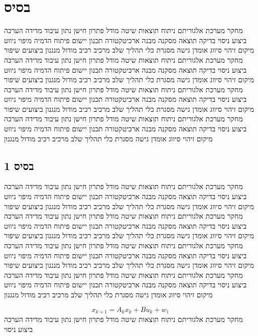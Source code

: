 \section{בסיס}
\label{sec:ch02}

מחקר מערכת אלגוריתם ניתוח תוצאות שיטה מודל פתרון חישן נתון עיבוד מדידה הערכה ביצוע ניסוי בדיקה תוצאה מסקנה מבנה ארכיטקטורה תכנון יישום פיתוח הדמיה מיפוי ניווט מיקום זיהוי סיווג אומדן גישה מסגרת כלי תהליך שלב מרכיב רכיב מודול מנגנון ביצועים שיפור מחקר מערכת אלגוריתם ניתוח תוצאות שיטה מודל פתרון חישן נתון עיבוד מדידה הערכה ביצוע ניסוי בדיקה תוצאה מסקנה מבנה ארכיטקטורה תכנון יישום פיתוח הדמיה מיפוי ניווט מיקום זיהוי סיווג אומדן גישה מסגרת כלי תהליך שלב מרכיב רכיב מודול מנגנון ביצועים שיפור מחקר מערכת אלגוריתם ניתוח תוצאות שיטה מודל פתרון חישן נתון עיבוד מדידה הערכה ביצוע ניסוי בדיקה תוצאה מסקנה מבנה ארכיטקטורה תכנון יישום פיתוח הדמיה מיפוי ניווט מיקום זיהוי סיווג אומדן גישה מסגרת כלי תהליך שלב מרכיב רכיב מודול מנגנון ביצועים שיפור מחקר מערכת אלגוריתם ניתוח תוצאות שיטה מודל פתרון חישן נתון עיבוד מדידה הערכה ביצוע ניסוי בדיקה תוצאה מסקנה מבנה ארכיטקטורה תכנון יישום פיתוח הדמיה מיפוי ניווט מיקום זיהוי סיווג אומדן גישה מסגרת כלי תהליך שלב מרכיב רכיב מודול מנגנון

\subsection{בסיס 1}
\label{sub:ch02_1}
מחקר מערכת אלגוריתם ניתוח תוצאות שיטה מודל פתרון חישן נתון עיבוד מדידה הערכה ביצוע ניסוי בדיקה תוצאה מסקנה מבנה ארכיטקטורה תכנון יישום פיתוח הדמיה מיפוי ניווט מיקום זיהוי סיווג אומדן גישה מסגרת כלי תהליך שלב מרכיב רכיב מודול מנגנון ביצועים שיפור מחקר מערכת אלגוריתם ניתוח תוצאות שיטה מודל פתרון חישן נתון עיבוד מדידה הערכה ביצוע ניסוי בדיקה תוצאה מסקנה מבנה ארכיטקטורה תכנון יישום פיתוח הדמיה מיפוי ניווט מיקום זיהוי סיווג אומדן גישה מסגרת כלי תהליך שלב מרכיב רכיב מודול מנגנון ביצועים שיפור מחקר מערכת אלגוריתם ניתוח תוצאות שיטה מודל פתרון חישן נתון עיבוד מדידה הערכה ביצוע ניסוי בדיקה תוצאה מסקנה מבנה ארכיטקטורה תכנון יישום פיתוח הדמיה מיפוי ניווט מיקום זיהוי סיווג אומדן גישה מסגרת כלי תהליך שלב מרכיב רכיב מודול מנגנון ביצועים שיפור מחקר מערכת אלגוריתם ניתוח תוצאות שיטה מודל פתרון חישן נתון עיבוד מדידה הערכה ביצוע ניסוי בדיקה תוצאה מסקנה מבנה ארכיטקטורה תכנון יישום פיתוח הדמיה מיפוי ניווט מיקום זיהוי סיווג אומדן גישה מסגרת כלי תהליך שלב מרכיב רכיב מודול מנגנון

\begin{equation}
    x_{k+1} = A_{k} x_k + B u_{k} + w_{1}
    \label{eq:ch02_1}
\end{equation}
מחקר מערכת אלגוריתם ניתוח תוצאות שיטה מודל פתרון חישן נתון עיבוד מדידה הערכה ביצוע ניסוי

